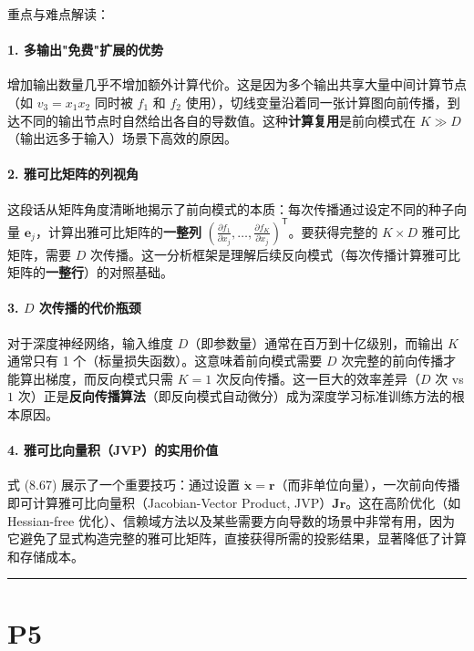 \documentclass{article}
\begin{document}
{\color{blue}
重点与难点解读：

\paragraph{1. 多输出"免费"扩展的优势}
增加输出数量几乎不增加额外计算代价。这是因为多个输出共享大量中间计算节点（如 $v_3 = x_1 x_2$ 同时被 $f_1$ 和 $f_2$ 使用），切线变量沿着同一张计算图向前传播，到达不同的输出节点时自然给出各自的导数值。这种\textbf{计算复用}是前向模式在 $K \gg D$（输出远多于输入）场景下高效的原因。

\paragraph{2. 雅可比矩阵的列视角}
这段话从矩阵角度清晰地揭示了前向模式的本质：每次传播通过设定不同的种子向量 $\mathbf{e}_j$，计算出雅可比矩阵的\textbf{一整列} $\left(\frac{\partial f_1}{\partial x_j}, \dots, \frac{\partial f_K}{\partial x_j}\right)^{\mathsf{T}}$。要获得完整的 $K \times D$ 雅可比矩阵，需要 $D$ 次传播。这一分析框架是理解后续反向模式（每次传播计算雅可比矩阵的\textbf{一整行}）的对照基础。

\paragraph{3. $D$ 次传播的代价瓶颈}
对于深度神经网络，输入维度 $D$（即参数量）通常在百万到十亿级别，而输出 $K$ 通常只有 1 个（标量损失函数）。这意味着前向模式需要 $D$ 次完整的前向传播才能算出梯度，而反向模式只需 $K=1$ 次反向传播。这一巨大的效率差异（$D$ 次 vs $1$ 次）正是\textbf{反向传播算法}（即反向模式自动微分）成为深度学习标准训练方法的根本原因。

\paragraph{4. 雅可比向量积（JVP）的实用价值}
式 (8.67) 展示了一个重要技巧：通过设置 $\dot{\mathbf{x}} = \mathbf{r}$（而非单位向量），一次前向传播即可计算雅可比向量积（Jacobian-Vector Product, JVP）$\mathbf{J}\mathbf{r}$。这在高阶优化（如 Hessian-free 优化）、信赖域方法以及某些需要方向导数的场景中非常有用，因为它避免了显式构造完整的雅可比矩阵，直接获得所需的投影结果，显著降低了计算和存储成本。

}

\noindent\rule{\linewidth}{0.4pt}

\section{P5}
\end{document}
